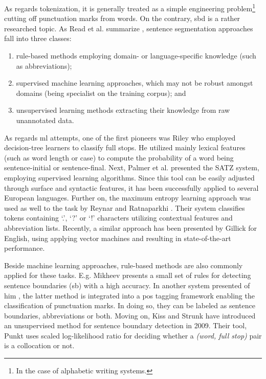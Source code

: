 As regards tokenization, it is generally treated as a simple engineering problem\footnote{In the case of alphabetic writing systems.} cutting off punctuation marks from words. 
On the contrary, \acrshort{sbd} is a rather researched topic. 
As Read et al. summarize \cite{read2012sentence}, sentence segmentation approaches fall into three classes: 
\begin{enumerate}
 \item rule-based methods employing domain- or language-specific knowledge (such as abbreviations); 
 \item supervised machine learning approaches, which may not be robust amongst domains (being specialist on the training corpus); and
 \item unsupervised learning methods extracting their knowledge from raw unannotated data. 
\end{enumerate}

As regards \acrshort{ml} attempts, one of the first pioneers was Riley \cite{riley1989some} who employed decision-tree learners to classify full stops. 
He utilized mainly lexical features (such as word length or case) to compute the probability of a word being sentence-initial or sentence-final. 
Next, Palmer et al. presented \cite{palmer1997adaptive} the SATZ system, employing supervised learning algorithms. 
Since this tool can be easily adjusted through surface and syntactic features, it has been successfully applied to several European languages. 
Further on, the maximum entropy learning approach was used as well to the task by Reynar and Ratnaparkhi \cite{reynar1997maximum}. 
Their system classifies tokens containing `.', `?' or `!' characters utilizing contextual features and abbreviation lists. 
Recently, a similar approach has been presented by Gillick \cite{gillick2009sentence} for English, using applying vector machines and resulting in state-of-the-art performance.

Beside machine learning approaches, rule-based methods are also commonly applied for these tasks. 
E.g. Mikheev presents \cite{mikheev2002periods} a small set of rules for detecting sentence boundaries (\acrshort{sb}) with a high accuracy. 
In another system presented of him \cite{mikheev2000tagging}, the latter method is integrated into a \acrshort{pos} tagging framework enabling the classification of punctuation marks. 
In doing so, they can be labeled as sentence boundaries, abbreviations or both. 
Moving on, Kiss and Strunk have introduced \cite{kiss2006unsupervised} an unsupervised method for sentence boundary detection in 2009. 
Their tool, Punkt uses scaled log-likelihood ratio for deciding whether a \emph{(word, full stop)} pair is a collocation or not.

